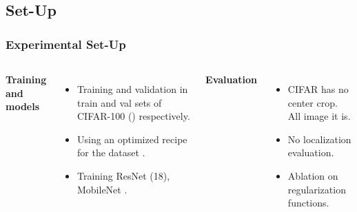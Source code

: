 \subsection*{Set-Up}
\begin{frame}[t]
    \frametitle{Experimental Set-Up}
    {\footnotesize
    \begin{columns}
        \textbf{Training and models}
            \begin{itemize}
                \item Training and validation in train and val sets of CIFAR-100
                (\cite{krizhevsky2009learning}) respectively.
                \item Using an optimized recipe for the dataset  \footnotemark.
                \item Training ResNet (18), MobileNet \cite{DBLP:journals/corr/HowardZCKWWAA17}.
                

            \end{itemize}\pause
        \textbf{Evaluation }
        \begin{itemize}
            \item CIFAR has no center crop. All image it is.%
            \item No localization evaluation.%
            \item Ablation on regularization functions.
        \end{itemize}
    \end{columns}
    }
\end{frame}